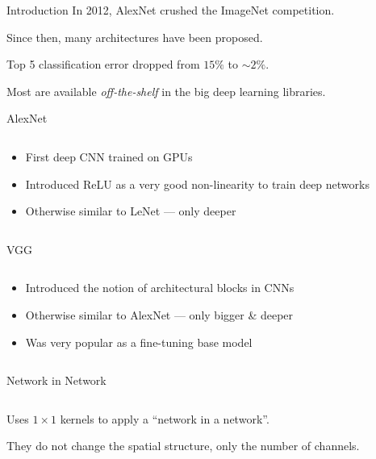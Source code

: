 \begin{frame}{Introduction}
  In 2012, AlexNet crushed the ImageNet competition.
  
  Since then, many architectures have been proposed.

  Top 5 classification error dropped from $15\%$ to $\sim2\%$.

  Most are available \emph{off-the-shelf} in the big deep learning libraries.
\end{frame}

\begin{frame}{AlexNet}
  \begin{columns}
    \begin{column}{0.5\textwidth}
      \begin{itemize}[<+->]
        \item First deep CNN trained on GPUs
        \item Introduced ReLU as a very good non-linearity to train deep networks
        \item Otherwise similar to LeNet --- only deeper
      \end{itemize}
    \end{column}
    \begin{column}{0.5\textwidth}
    \end{column}
  \end{columns}
\end{frame}

\begin{frame}{VGG}
  \begin{columns}
    \begin{column}{0.45\textwidth}
      \begin{itemize}[<+->]
        \item Introduced the notion of architectural blocks in CNNs
        \item Otherwise similar to AlexNet --- only bigger \& deeper
        \item Was very popular as a fine-tuning base model
      \end{itemize}
    \end{column}
    \begin{column}{0.55\textwidth}
    \end{column}
  \end{columns}
\end{frame}

\begin{frame}{Network in Network}
  \begin{columns}
    \begin{column}{0.4\textwidth}
      Uses  $1 \times 1$ kernels to apply a “network in a network”.

      They do not change the spatial structure, only the number of channels.
    \end{column}
    \begin{column}{0.6\textwidth}
    \end{column}
  \end{columns}
\end{frame}

